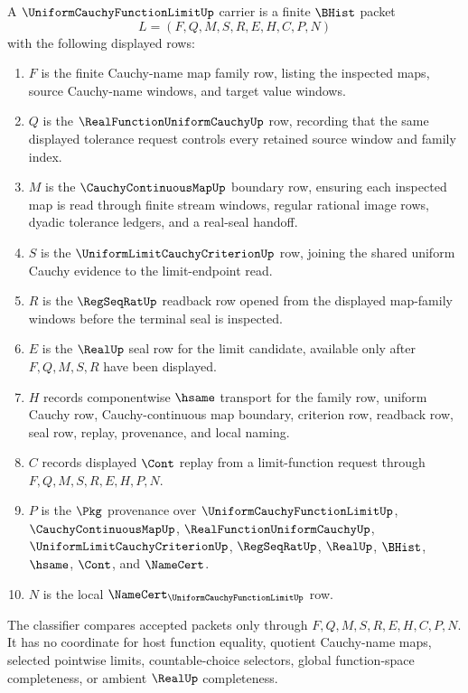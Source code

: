 \begin{definition}\label{def:uniform-cauchy-function-limit-carrier}
A $\UniformCauchyFunctionLimitUp$ carrier is a finite $\BHist$ packet
$$
L=(F,Q,M,S,R,E,H,C,P,N)
$$
with the following displayed rows:
\begin{enumerate}
\item $F$ is the finite Cauchy-name map family row, listing the inspected maps, source Cauchy-name windows, and target value windows.
\item $Q$ is the $\RealFunctionUniformCauchyUp$ row, recording that the same displayed tolerance request controls every retained source window and family index.
\item $M$ is the $\CauchyContinuousMapUp$ boundary row, ensuring each inspected map is read through finite stream windows, regular rational image rows, dyadic tolerance ledgers, and a real-seal handoff.
\item $S$ is the $\UniformLimitCauchyCriterionUp$ row, joining the shared uniform Cauchy evidence to the limit-endpoint read.
\item $R$ is the $\RegSeqRatUp$ readback row opened from the displayed map-family windows before the terminal seal is inspected.
\item $E$ is the $\RealUp$ seal row for the limit candidate, available only after $F,Q,M,S,R$ have been displayed.
\item $H$ records componentwise $\hsame$ transport for the family row, uniform Cauchy row, Cauchy-continuous map boundary, criterion row, readback row, seal row, replay, provenance, and local naming.
\item $C$ records displayed $\Cont$ replay from a limit-function request through $F,Q,M,S,R,E,H,P,N$.
\item $P$ is the $\Pkg$ provenance over $\UniformCauchyFunctionLimitUp$, $\CauchyContinuousMapUp$, $\RealFunctionUniformCauchyUp$, $\UniformLimitCauchyCriterionUp$, $\RegSeqRatUp$, $\RealUp$, $\BHist$, $\hsame$, $\Cont$, and $\NameCert$.
\item $N$ is the local $\NameCert_{\UniformCauchyFunctionLimitUp}$ row.
\end{enumerate}
The classifier compares accepted packets only through $F,Q,M,S,R,E,H,C,P,N$. It has no coordinate for host function equality, quotient Cauchy-name maps, selected pointwise limits, countable-choice selectors, global function-space completeness, or ambient $\RealUp$ completeness.
\end{definition}

